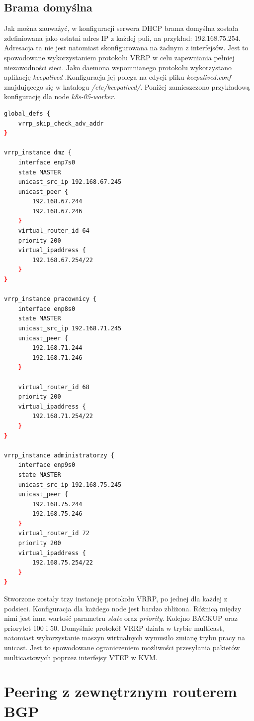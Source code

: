 \documentclass[pl,final,oneside]{mgr} %
\begin{document}
\subsection{Brama domyślna}
Jak można zauważyć, w konfiguracji serwera DHCP brama domyślna została zdefiniowana jako ostatni adres IP z każdej puli, na przykład: 192.168.75.254. Adresacja ta nie jest natomiast skonfigurowana na żadnym z interfejsów. Jest to spowodowane wykorzystaniem protokołu VRRP w celu zapewniania pełniej niezawodności sieci. Jako daemona wspomnianego protokołu wykorzystano aplikację \textit{keepalived} .Konfiguracja jej polega na edycji pliku \textit{keepalived.conf} znajdującego się w katalogu \textit{/etc/keepalived/}. Poniżej zamieszczono przykładową konfigurację dla node \textit{k8s-05-worker}.
\begin{lstlisting}[language=Bash]
global_defs {
	vrrp_skip_check_adv_addr
}

vrrp_instance dmz {
	interface enp7s0          
	state MASTER
	unicast_src_ip 192.168.67.245
	unicast_peer {
		192.168.67.244
		192.168.67.246
	}
	virtual_router_id 64     
	priority 200               
	virtual_ipaddress {
		192.168.67.254/22     
	}
}

vrrp_instance pracownicy {
	interface enp8s0         
	state MASTER   
	unicast_src_ip 192.168.71.245
	unicast_peer {
		192.168.71.244
		192.168.71.246
	}
	
	virtual_router_id 68  
	priority 200             
	virtual_ipaddress {
		192.168.71.254/22   
	}
}

vrrp_instance administratorzy {
	interface enp9s0
	state MASTER          
	unicast_src_ip 192.168.75.245
	unicast_peer {
		192.168.75.244
		192.168.75.246
	}
	virtual_router_id 72      
	priority 200               
	virtual_ipaddress {
		192.168.75.254/22        
	}
}
\end{lstlisting}
Stworzone zostały trzy instancję protokołu VRRP, po jednej dla każdej z podsieci. Konfiguracja dla każdego node jest bardzo zbliżona. Różnicą między nimi jest inna wartość parametru \textit{state} oraz \textit{priority}. Kolejno BACKUP oraz priorytet 100 i 50. Domyślnie protokół VRRP działa w trybie multicast, natomiast wykorzystanie maszyn wirtualnych wymusiło zmianę trybu pracy na unicast. Jest to spowodowane ograniczeniem możliwości przesyłania pakietów multicastowych poprzez interfejsy VTEP w KVM.


\section{Peering z zewnętrznym routerem BGP}
\end{document}

